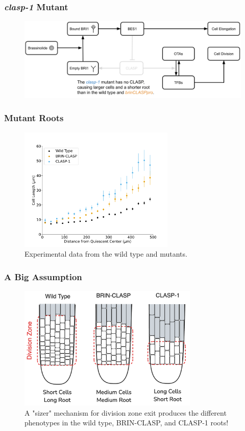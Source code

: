 \documentclass{beamer}
\begin{document}
\begin{frame}
\frametitle{\emph{clasp-1} Mutant}
\begin{figure}
  \centering
  \includegraphics[width=\textwidth]{network-clasp-1.png}
\end{figure}
\end{frame}

\begin{frame}
\frametitle{Mutant Roots}
\begin{figure}
    \centering
    \includegraphics[height=16em]{data-binned-500.pdf}
    \caption{Experimental data from the wild type and mutants.}
\end{figure}
\end{frame}

\begin{frame}
\frametitle{A Big Assumption}
\begin{figure}
    \centering
    \includegraphics[height=16em]{mutant-phenotypes.png}
    \caption{A "sizer" mechanism for division zone exit produces the different phenotypes in the wild type, BRIN-CLASP, and CLASP-1 roots!}
\end{figure}
\end{frame}
\end{document}
